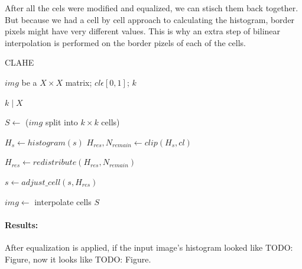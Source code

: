 After all the cels were modified and equalized, we can stisch them back together. But because we had a cell by cell approach to calculating the histogram, border pixels might have very different values. This is why an extra step of bilinear interpolation is performed on the border pizels of each of the cells.

\begin{algorithm}[t]
\caption{CLAHE}\label{alg:CLAHE}
\begin{algorithmic}[1]
    \Require $img$ be a $X\times X$ matrix; $cl \epsilon [0, 1]$; $k$

    \Ensure $k \mid X$

    \State $S \gets $ ($img$ split into $k\times k$ cells)

        \State $H_s \gets histogram(s)$
        \State $H_{res}, N_{remain} \gets clip(H_s, cl)$

        \State $H_{res} \gets redistribute(H_{res}, N_{remain})$

        \State $s \gets adjust\_cell(s, H_{res})$
    \EndFor

    \State $img \gets$ interpolate cells $S$

\end{algorithmic}
\end{algorithm}

\paragraph*{Results:}\mbox{}\par
After equalization is applied, if the input image's histogram looked like TODO: Figure, now it looks like TODO: Figure.

